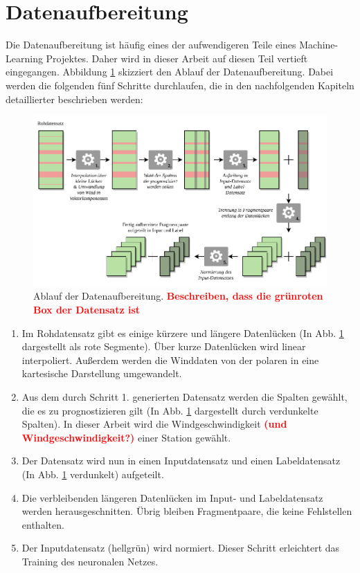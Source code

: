 \documentclass[
12pt, %
toc=listofnumbered, %
toc=chapterentrydotfill, %
numbers=noenddot, %
captions=tableheading, %
bibliography=numbered
]{scrreprt}
\let\Oldsection\section
\renewcommand{\section}{\FloatBarrier\Oldsection}
\newcommand{\qm}[1]{\glqq#1\grqq{}} %
\newcommand{\highlight}[1]{\textbf{\textcolor{red}{#1}}}
\begin{document}
\section{Datenaufbereitung}\label{section:Datenaufbereitung}
Die Datenaufbereitung ist häufig eines der aufwendigeren Teile eines Machine-Learning Projektes. Daher wird in dieser Arbeit auf diesen Teil vertieft eingegangen. Abbildung \ref{fig:preprocessing} skizziert den Ablauf der Datenaufbereitung. Dabei werden die folgenden fünf Schritte durchlaufen, die in den nachfolgenden Kapiteln detaillierter beschrieben werden:

\begin{figure}[tph]
	\begin{center}
		\includegraphics[]{./images/preprocessing.pdf}
		\caption{Ablauf der Datenaufbereitung. \highlight{Beschreiben, dass die grünroten Box der Datensatz ist}}
		\label{fig:preprocessing}
	\end{center}
\end{figure}

\begin{enumerate}
	\item Im Rohdatensatz gibt es einige kürzere und längere Datenlücken (In Abb. \ref{fig:preprocessing} dargestellt als rote Segmente). Über kurze Datenlücken wird linear interpoliert. Außerdem werden die Winddaten von der polaren in eine kartesische Darstellung umgewandelt.
	\item Aus dem durch Schritt 1. generierten Datensatz werden die Spalten gewählt, die es zu prognostizieren gilt (In Abb. \ref{fig:preprocessing} dargestellt durch verdunkelte Spalten). In dieser Arbeit wird die Windgeschwindigkeit \highlight{(und Windgeschwindigkeit?)} einer Station gewählt.
	\item Der Datensatz wird nun in einen Inputdatensatz und einen Labeldatensatz (In Abb. \ref{fig:preprocessing} verdunkelt) aufgeteilt.
	\item Die verbleibenden längeren Datenlücken im Input- und Labeldatensatz werden \qm{herausgeschnitten}. Übrig bleiben Fragmentpaare, die keine Fehlstellen enthalten.
	\item Der Inputdatensatz (hellgrün) wird normiert. Dieser Schritt erleichtert das Training des neuronalen Netzes.
\end{enumerate}
\end{document}
